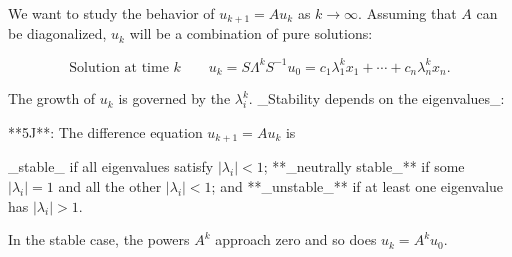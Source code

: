 We want to study the behavior of \(u_{k+1}=Au_{k}\) as \(k\to\infty\). Assuming that \(A\) can be diagonalized, \(u_{k}\) will be a combination of pure solutions:

\[\text{{Solution at time }}k\qquad u_{k}=S\Lambda^{k}S^{-1}u_{0}=c_{1} \lambda_{1}^{k}x_{1}+\cdots+c_{n}\lambda_{n}^{k}x_{n}.\]

The growth of \(u_{k}\) is governed by the \(\lambda_{i}^{k}\). _Stability depends on the eigenvalues_:

**5J**: The difference equation \(u_{k+1}=Au_{k}\) is

_stable_ if all eigenvalues satisfy \(|\lambda_{i}|<1\);
**_neutrally stable_** if some \(|\lambda_{i}|=1\) and all the other \(|\lambda_{i}|<1\); and
**_unstable_** if at least one eigenvalue has \(|\lambda_{i}|>1\).

In the stable case, the powers \(A^{k}\) approach zero and so does \(u_{k}=A^{k}u_{0}\).

 